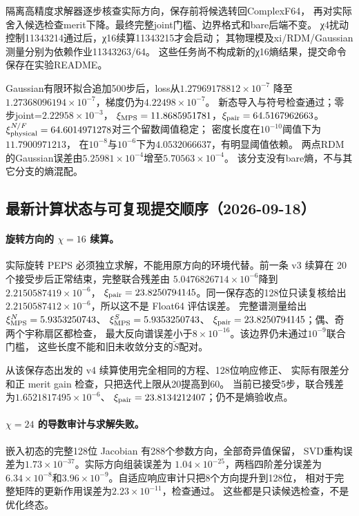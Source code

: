 隔离高精度求解器逐步核查实际方向，保存前将候选转回ComplexF64，
再对实际舍入候选检查merit下降。最终完整joint门槛、边界格式和bare后端不变。
χ4扰动控制11343214通过后，χ16续算11343215才会启动；
其物理模及xi/RDM/Gaussian测量分别为依赖作业11343263/64。
这些任务尚不构成新的χ16熵结果，提交命令保存在实验README。

Gaussian有限环拟合追加500步后，loss从$1.27969178812\times10^{-7}$
降至$1.27368096194\times10^{-7}$，梯度仍为$4.22498\times10^{-7}$。
新态导入与符号检查通过；零步joint=$2.22958\times10^{-3}$，
$\xi_{\rm MPS}=11.8685951781$，$\xi_{\rm pair}=64.5167962663$。
$\xi_{\rm physical}^{N/F}=64.6014971278$对三个留数阈值稳定；
密度长度在$10^{-10}$阈值下为$11.7900971213$，
在$10^{-8}$与$10^{-6}$下为$4.0532066637$，有明显阈值依赖。
两点RDM的Gaussian误差由$5.25981\times10^{-4}$增至$5.70563\times10^{-4}$。
该分支没有bare熵，不与其它分支的熵混配。


\subsection{最新计算状态与可复现提交顺序（2026-09-18）}

\paragraph{旋转方向的 $\chi=16$ 续算。}
实际旋转 PEPS 必须独立求解，不能用原方向的环境代替。前一条 v3 续算在
20 个接受步后正常结束，完整联合残差由
$5.0476826714\times10^{-6}$降到$2.2150587419\times10^{-6}$，
$\xi_{\rm pair}=23.8250794145$。同一保存态的128位只读复核给出
$2.2150587412\times10^{-6}$，所以这不是 Float64 评估误差。
完整谱测量给出
$\xi_{\rm MPS}^{N}=5.9353250743$、
$\xi_{\rm MPS}^{S}=5.9353250743$、
$\xi_{\rm pair}=23.8250794145$；偶、奇两个宇称扇区都检查，
最大反向谱误差小于$8\times10^{-16}$。该边界仍未通过$10^{-9}$联合门槛，
这些长度不能和旧未收敛分支的$\widetilde S$配对。

从该保存态出发的 v4 续算使用完全相同的方程、128位响应修正、
实际有限差分和正 merit gain 检查，只把迭代上限从20提高到60。
当前已接受5步，联合残差为$1.6521817495\times10^{-6}$、
$\xi_{\rm pair}=23.8134212407$；仍不是熵验收点。

\paragraph{$\chi=24$ 的导数审计与求解失败。}
嵌入初态的完整128位 Jacobian 有288个参数方向，全部奇异值保留，
SVD重构误差为$1.73\times10^{-37}$。实际方向组装误差为
$1.04\times10^{-25}$，两档四阶差分误差为
$6.34\times10^{-8}$和$3.96\times10^{-9}$。自适应响应审计只把8个方向提升到128位，
相对于完整矩阵的更新作用误差为$2.23\times10^{-11}$，检查通过。
这些都是只读候选检查，不是优化终态。

